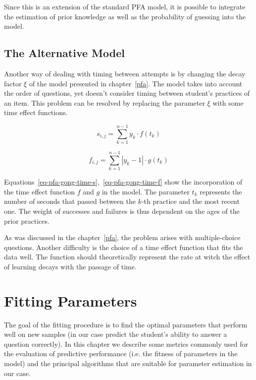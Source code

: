 Since this is an extension of the standard PFA model, it is possible to integrate the estimation of prior knowledge as well as the probability of guessing into the model.

\subsection{The Alternative Model}

Another way of dealing with timing between attempts is by changing the decay factor $\xi$ of the model presented in chapter~\ref{pfa}. The model takes into account the order of questions, yet doesn't consider timing between student's practices of an item. This problem can be resolved by replacing the parameter $\xi$ with some time effect functions.

\begin{equation} \label{eq-pfa-gong-time-s}
  s_{i,j} = \sum_{k=1}^{n-1} y_k \cdot f(t_k)
\end{equation}

\begin{equation} \label{eq-pfa-gong-time-f}
  f_{i,j} = \sum_{k=1}^{n-1} |y_k - 1| \cdot g(t_k)
\end{equation}

Equations~\ref{eq-pfa-gong-time-s},~\ref{eq-pfa-gong-time-f} show the incorporation of the time effect function $f$ and $g$ in the model. The parameter $t_k$ represents the number of seconds that passed between the $k$-th practice and the most recent one. The weight of successes and failures is thus dependent on the ages of the prior practices.

As was discussed in the chapter~\ref{pfa}, the problem arises with multiple-choice questions. Another difficulty is the choice of a time effect function that fits the data well. The function should theoretically represent the rate at witch the effect of learning decays with the passage of time.

\section{Fitting Parameters}

The goal of the fitting procedure is to find the optimal parameters that perform well on new samples (in our case predict the student's ability to answer a question correctly). In this chapter we describe some metrics commonly used for the evaluation of predictive performance (i.e. the fitness of parameters in the model) and the principal algorithms that are suitable for parameter estimation in our case.

